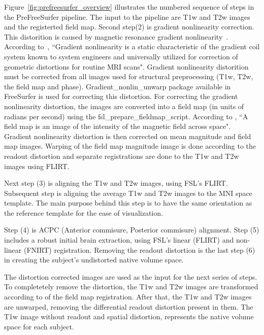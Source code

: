 Figure~\ref{fig:prefreesurfer_overview} illustrates the numbered sequence of steps in the PreFreeSurfer pipeline. The input to the pipeline are T1w and T2w images and the registerted field map. Second step(2) is gradient nonlinearity correction. This distorition is caused by magnetic resonance gradient nonlinearity~\cite{Gla13}. According to~\cite{Zou2004}, ``Gradient nonlinearity is a static characteristic of the gradient coil system known to system engineers and universally utilized for correction of geometric distortions for routine MRI scans". Gradient nonlinearity distorition must be corrected from all images used for structural preprocessing (T1w, T2w, the field map and phase). Gradient\_nonlin\_unwarp package available in FreeSurfer is used for correcting this distortion. For correcting the gradient nonlinearity distortion, the images are converted into a field map (in units of radians per second) using the fsl\_prepare\_fieldmap\_script. According to \cite{field_map}, ``A field map is an image of the intensity of the magnetic field across space". Gradient nonlinearity distortion is then corrected on mean magnitude and field map images. Warping of the field map magnitude image is done according to the readout distortion and separate registrations are done to the T1w and T2w images using FLIRT.

Next step (3) is aligning the T1w and T2w images, using FSL's FLIRT. Subsequent step is aligning the average T1w and T2w images to the MNI space template. The main purpose behind this step is to have the same orientation as the reference template for the ease of visualization.

Step (4) is ACPC (Anterior commisure, Posterior commisure) alignment. Step (5) includes a robust initial brain extraction, using FSL's linear (FLIRT) and non-linear (FNIRT) registration. Removing the readout distortion is the last step (6) in creating the subject's undistorted native volume space. %

The distortion corrected images are used as the input for the next series of steps. To completetely remove the distortion, the T1w and T2w images are transformed according to of the field map registration. After that, the T1w and T2w images are unwarped, removing the differential readout distortion present in them. The T1w image without readout and spatial distortion, represents the native volume space for each subject.

